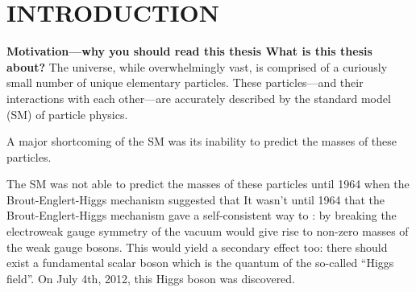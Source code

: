 \chapter{INTRODUCTION}
\label{ch:intro}

\textbf{Motivation---why you should read this thesis
What is this thesis about?}
The universe, while overwhelmingly vast, is comprised of a curiously small number of unique elementary particles.
These particles---and their interactions with each other---are accurately described by the standard model (SM) of particle physics.

A major shortcoming of the SM was its inability to predict the masses of these particles.

The SM was not able to predict the masses of these particles until 1964 when the Brout-Englert-Higgs mechanism suggested that 
It wasn't until 1964 that the Brout-Englert-Higgs mechanism gave a self-consistent way to :
by breaking the electroweak gauge symmetry of the vacuum would give rise to non-zero masses of the weak gauge bosons.
This would yield a secondary effect too:
there should exist a fundamental scalar boson which is the quantum of the so-called ``Higgs field''.
On July 4th, 2012, this Higgs boson was discovered.


